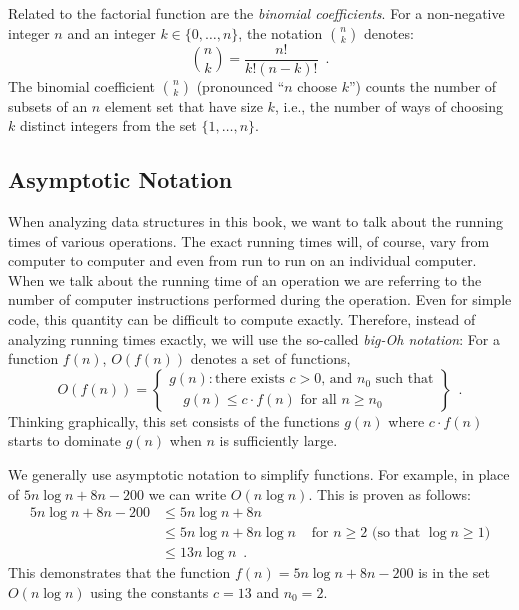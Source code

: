 Related to the factorial function are the \emph{binomial coefficients}.  For a non-negative integer $n$ and an integer $k\in\{0,\ldots,n\}$, the notation $\binom{n}{k}$ denotes:
\[
   \binom{n}{k} = \frac{n!}{k!(n-k)!} \enspace .
\]
The binomial coefficient $\binom{n}{k}$ (pronounced ``$n$ choose $k$'') counts the number of subsets of an $n$ element set that have size $k$, i.e., the number of ways of choosing $k$ distinct integers from the set $\{1,\ldots,n\}$.

\subsection{Asymptotic Notation}

   When analyzing data structures in this book, we want to talk about the running times of various operations.  The exact running times will, of course, vary from computer to computer and even from run to run on an individual computer.  When we talk about the running time of an operation we are referring to the number of computer instructions performed during the operation.  Even for simple code, this quantity can be difficult to compute exactly.  Therefore, instead of analyzing running times exactly, we will use the so-called \emph{big-Oh notation}: For a function $f(n)$, $O(f(n))$ denotes a set of functions,
\[
   O(f(n)) = \left\{
     \begin{array}{l}
       g(n):\mbox{there exists $c>0$, and $n_0$ such that} \\
             \quad\mbox{$g(n) \le c\cdot f(n)$ for all $n\ge n_0$}   
     \end{array} \right\} \enspace .
\]
Thinking graphically, this set consists of the functions $g(n)$ where $c\cdot f(n)$ starts to dominate $g(n)$ when $n$ is sufficiently large.

We generally use asymptotic notation to simplify functions.  For example, in place of $5n\log n + 8n - 200$ we can write $O(n\log n)$.
This is proven as follows:
\begin{align*} 
       5n\log n + 8n - 200
        & \le 5n\log n + 8n \\
        & \le 5n\log n + 8n\log n & \mbox{ for $n\ge 2$ (so that $\log n \ge 1$)}
            \\
        & \le 13n\log n  \enspace .
\end{align*}
This demonstrates that the function $f(n)=5n\log n + 8n - 200$ is in the set $O(n\log n)$ using the constants $c=13$ and $n_0 = 2$.

